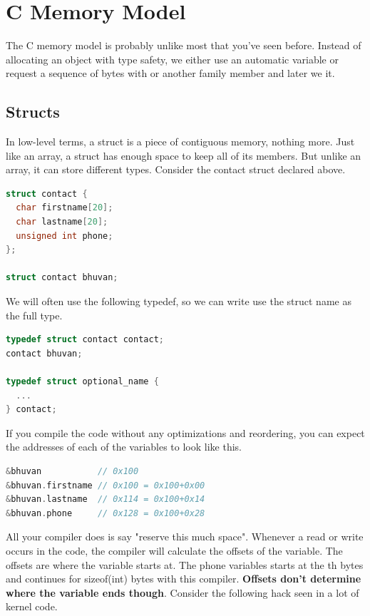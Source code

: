 \section{C Memory Model}

The C memory model is probably unlike most that you've seen before. Instead of allocating an object with type safety, we either use an automatic variable or request a sequence of bytes with  or another family member and later we  it.

\subsection{Structs}

In low-level terms, a struct is a piece of contiguous memory, nothing more.
Just like an array, a struct has enough space to keep all of its members.
But unlike an array, it can store different types. Consider the contact struct declared above.

\begin{lstlisting}[language=C]
struct contact {
  char firstname[20];
  char lastname[20];
  unsigned int phone;
};

struct contact bhuvan;
\end{lstlisting}

We will often use the following typedef, so we can write use the struct name as the full type.

\begin{lstlisting}[language=C]
typedef struct contact contact;
contact bhuvan;

typedef struct optional_name {
  ...
} contact;
\end{lstlisting}

If you compile the code without any optimizations and reordering, you can expect the addresses of each of the variables to look like this.

\begin{lstlisting}[language=C]
&bhuvan           // 0x100
&bhuvan.firstname // 0x100 = 0x100+0x00
&bhuvan.lastname  // 0x114 = 0x100+0x14
&bhuvan.phone     // 0x128 = 0x100+0x28
\end{lstlisting}

All your compiler does is say "reserve this much space".
Whenever a read or write occurs in the code, the compiler will calculate the offsets of the variable.
The offsets are where the variable starts at.
The phone variables starts at the th bytes and continues for sizeof(int) bytes with this compiler.
\textbf{Offsets don't determine where the variable ends though}.
Consider the following hack seen in a lot of kernel code.

